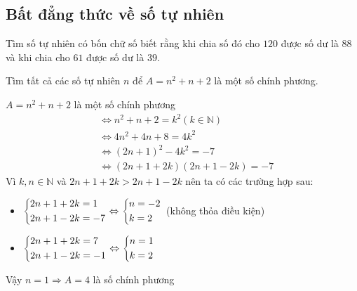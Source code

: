 \subsection{Bất đẳng thức về số tự nhiên}
\begin{bt}%
	Tìm số tự nhiên có bốn chữ số biết rằng khi chia số đó cho $120$ được số dư là $88$ và khi chia cho $61$ được số dư là $39$. 
\end{bt}
\begin{bt}%
	Tìm tất cả các số tự nhiên $n$ để $A=n^2+n+2$ là một số chính phương.
	\loigiai
	{
		$A=n^2+n+2$ là một số chính phương
		\begin{align*}
			&\Leftrightarrow n^2+n+2=k^2 (k\in\mathbb{N})\\
			&\Leftrightarrow 4n^2+4n+8=4k^2\\
			&\Leftrightarrow (2n+1)^2-4k^2=-7\\
			&\Leftrightarrow (2n+1+2k)(2n+1-2k)=-7
		\end{align*} 
		Vì $k,n\in\mathbb{N}$ và $2n+1+2k>2n+1-2k$ nên ta có các trường hợp sau: 
		\hfill
		\begin{itemize}
			\item $\left\{\begin{aligned}&2n+1+2k=1\\&2n+1-2k=-7\end{aligned}\right.\Leftrightarrow \left\{\begin{aligned}&n=-2\\&k=2\end{aligned}\right.$ (không thỏa điều kiện)
			\item $\left\{\begin{aligned}&2n+1+2k=7\\&2n+1-2k=-1\end{aligned}\right.\Leftrightarrow \left\{\begin{aligned}&n=1\\&k=2\end{aligned}\right.$
		\end{itemize}
		Vậy $n=1\Rightarrow A=4$ là số chính phương
	}
\end{bt}
